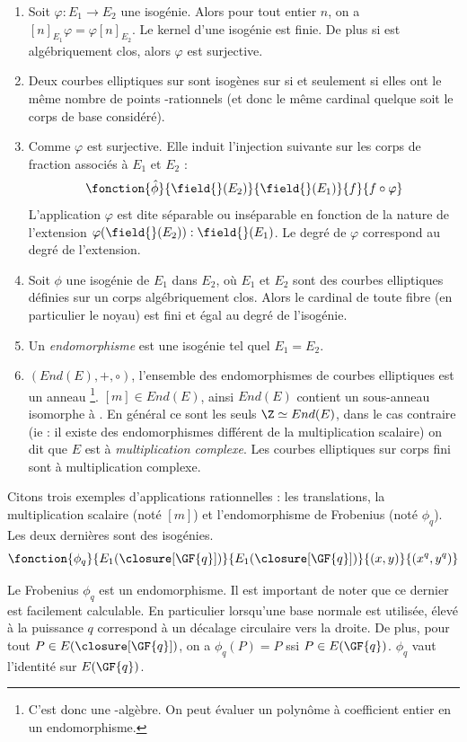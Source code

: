 \begin{enumerate}
    \item Soit $\varphi \colon E_1 \to E_2$ une isogénie. Alors pour tout entier $n$, on a $[n]_{E_1}\varphi = \varphi [n]_{E_2}$. Le kernel d'une isogénie est finie. De plus si \field{} est algébriquement clos, alors $\varphi$ est surjective.
    \item Deux courbes elliptiques sur  sont isogènes sur  si et seulement si elles ont le même nombre de points -rationnels (et donc le même cardinal quelque soit le corps de base considéré).
    \item Comme $\varphi$ est surjective. Elle induit l'injection suivante sur les corps de fraction associés à $E_1$ et $E_2$ :
    \begin{equation}
        \fonction{\hat{\phi}}{\field{}(E_2)}{\field{}(E_1)}{f}{f\circ \varphi}
    \end{equation}
    L'application $\varphi$ est dite séparable ou inséparable en fonction de la nature de l'extension $\varphi(\field{}(E_2)) : \field{}(E_1)$. Le degré de $\varphi$ correspond au degré de l'extension.
    \item Soit $\phi$ une isogénie de $E_1$ dans $E_2$, où $E_1$ et $E_2$ sont des courbes elliptiques définies sur un corps algébriquement clos. Alors le cardinal de toute fibre (en particulier le noyau) est fini et égal au degré de l'isogénie.
    \item Un \emph{endomorphisme} est une isogénie tel quel $E_1 = E_2$.
    \item $(End(E), +, \circ)$, l'ensemble des endomorphismes de courbes elliptiques est un anneau \footnote{C'est donc une \Z-algèbre. On peut évaluer un polynôme à coefficient entier en un endomorphisme.}. $[m] \in End(E)$, ainsi $End(E)$ contient un sous-anneau isomorphe à \Z. En général ce sont les seuls $\Z \simeq End(E)$, dans le cas contraire (ie : il existe des endomorphismes différent de la multiplication scalaire) on dit que $E$ est à \emph{multiplication complexe}. Les courbes elliptiques sur corps fini sont à multiplication complexe.
\end{enumerate}
Citons trois exemples d'applications rationnelles : les translations, la multiplication scalaire (noté $[m]$) et l'endomorphisme de Frobenius (noté $\phi_q$). Les deux dernières sont des isogénies.
$$\fonction{\phi_q}{E_1(\closure[\GF{q}])}{E_1(\closure[\GF{q}])}{(x, y)}{(x^q, y^q)}$$

Le Frobenius $\phi_q$ est un endomorphisme. Il est important de noter que ce dernier est facilement calculable. En particulier lorsqu'une base normale est utilisée, élevé à la puissance $q$ correspond à un décalage circulaire vers la droite. De plus, pour tout $P \in E(\closure[\GF{q}])$, on a $\phi_q(P) = P$ ssi $P \in E(\GF{q})$. $\phi_q$ vaut l'identité sur $E(\GF{q})$.

